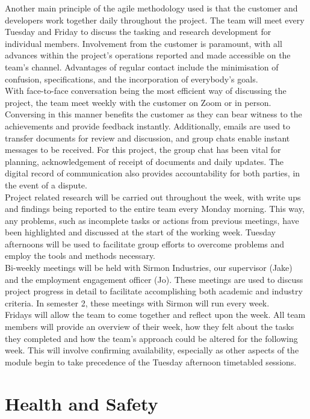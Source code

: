 \documentclass [12pt]{article}
\begin{document}
Another main principle of the agile methodology used is that the customer and developers work together daily throughout the project. The team will meet every Tuesday and Friday to discuss the tasking and research development for individual members. Involvement from the customer is paramount, with all advances within the project's operations reported and made accessible on the team's channel. Advantages of regular contact include the minimisation of confusion, specifications, and the incorporation of everybody's goals.
\\
With face-to-face conversation being the most efficient way of discussing the project, the team meet weekly with the customer on Zoom or in person. Conversing in this manner benefits the customer as they can bear witness to the achievements and provide feedback instantly. Additionally, emails are used to transfer documents for review and discussion, and group chats enable instant messages to be received. For this project, the group chat has been vital for planning, acknowledgement of receipt of documents and daily updates. The digital record of communication also provides accountability for both parties, in the event of a dispute.
\\
Project related research will be carried out throughout the week, with write ups and findings being reported to the entire team every Monday morning. This way, any problems, such as incomplete tasks or actions from previous meetings, have been highlighted and discussed at the start of the working week. Tuesday afternoons will be used to facilitate group efforts to overcome problems and employ the tools and methods necessary.
\\
Bi-weekly meetings will be held with Sirmon Industries, our supervisor (Jake) and the employment engagement officer (Jo). These meetings are used to discuss project progress in detail to facilitate accomplishing both academic and industry criteria. In semester 2, these meetings with Sirmon will run every week.
\\
Fridays will allow the team to come together and reflect upon the week. All team members will provide an overview of their week, how they felt about the tasks they completed and how the team’s approach could be altered for the following week. This will involve confirming availability, especially as other aspects of the module begin to take precedence of the Tuesday afternoon timetabled sessions.

\section{Health and Safety}\label{sec:health_and_safety}
\end{document}
